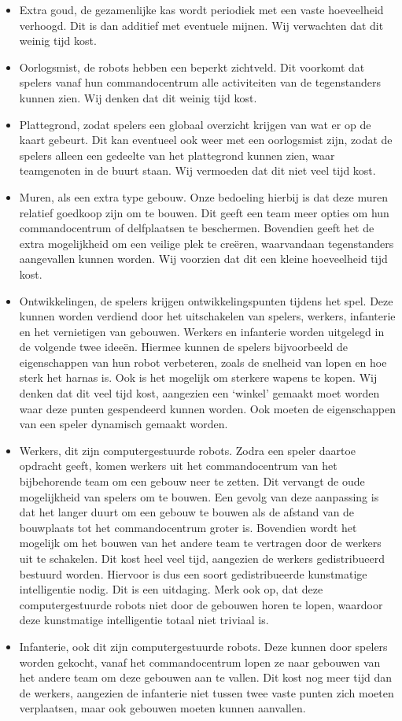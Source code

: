 \documentclass[a4paper,11pt, twoside]{article}
\begin{document}
    \begin{itemize}
    \item Extra goud, de gezamenlijke kas wordt periodiek met een vaste hoeveelheid verhoogd. Dit is dan additief met eventuele mijnen. Wij verwachten dat dit weinig tijd kost.
    \item Oorlogsmist, de robots hebben een beperkt zichtveld. Dit voorkomt dat spelers vanaf hun commandocentrum alle activiteiten van de tegenstanders kunnen zien. Wij denken dat dit weinig tijd kost.
    \item Plattegrond, zodat spelers een globaal overzicht krijgen van wat er op de kaart gebeurt. Dit kan eventueel ook weer met een oorlogsmist zijn, zodat de spelers alleen een gedeelte van het plattegrond kunnen zien, waar teamgenoten in de buurt staan. Wij vermoeden dat dit niet veel tijd kost.
    \item Muren, als een extra type gebouw. Onze bedoeling hierbij is dat deze muren relatief goedkoop zijn om te bouwen. Dit geeft een team meer opties om hun commandocentrum of delfplaatsen te beschermen. Bovendien geeft het de extra mogelijkheid om een veilige plek te cre\"eren, waarvandaan tegenstanders aangevallen kunnen worden. Wij voorzien dat dit een kleine hoeveelheid tijd kost.
    \item Ontwikkelingen, de spelers krijgen ontwikkelingspunten tijdens het spel. Deze kunnen worden verdiend door het uitschakelen van spelers, werkers, infanterie en het vernietigen van gebouwen. Werkers en infanterie worden uitgelegd in de volgende twee idee\"en. Hiermee kunnen de spelers bijvoorbeeld de eigenschappen van hun robot verbeteren, zoals de snelheid van lopen en hoe sterk het harnas is. Ook is het mogelijk om sterkere wapens te kopen. Wij denken dat dit veel tijd kost, aangezien een `winkel' gemaakt moet worden waar deze punten gespendeerd kunnen worden. Ook moeten de eigenschappen van een speler dynamisch gemaakt worden.
    \item Werkers, dit zijn computergestuurde robots. Zodra een speler daartoe opdracht geeft, komen werkers uit het commandocentrum van het bijbehorende team om een gebouw neer te zetten. Dit vervangt de oude mogelijkheid van spelers om te bouwen. Een gevolg van deze aanpassing is dat het langer duurt om een gebouw te bouwen als de afstand van de bouwplaats tot het commandocentrum groter is. Bovendien wordt het mogelijk om het bouwen van het andere team te vertragen door de werkers uit te schakelen. Dit kost heel veel tijd, aangezien de werkers gedistribueerd bestuurd worden. Hiervoor is dus een soort gedistribueerde kunstmatige intelligentie nodig. Dit is een uitdaging. Merk ook op, dat deze computergestuurde robots niet door de gebouwen horen te lopen, waardoor deze kunstmatige intelligentie totaal niet triviaal is.
    \item Infanterie, ook dit zijn computergestuurde robots. Deze kunnen door spelers worden gekocht, vanaf het commandocentrum lopen ze naar gebouwen van het andere team om deze gebouwen aan te vallen. Dit kost nog meer tijd dan de werkers, aangezien de infanterie niet tussen twee vaste punten zich moeten verplaatsen, maar ook gebouwen moeten kunnen aanvallen.
    \end{itemize} 
\end{document}
